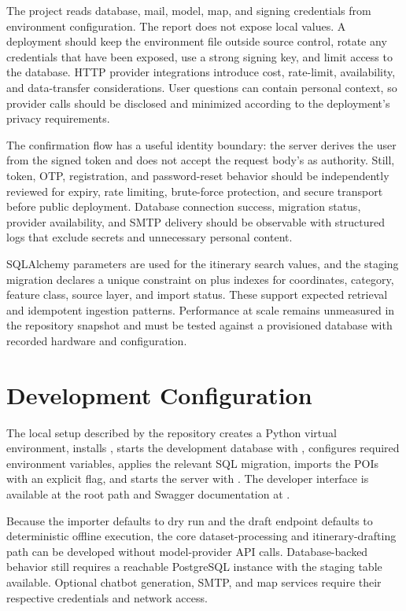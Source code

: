 The project reads database, mail, model, map, and signing credentials from environment configuration. The report does not expose local  values. A deployment should keep the environment file outside source control, rotate any credentials that have been exposed, use a strong signing key, and limit access to the database. HTTP provider integrations introduce cost, rate-limit, availability, and data-transfer considerations. User questions can contain personal context, so provider calls should be disclosed and minimized according to the deployment's privacy requirements.

The confirmation flow has a useful identity boundary: the server derives the user from the signed token and does not accept the request body's  as authority. Still, token, OTP, registration, and password-reset behavior should be independently reviewed for expiry, rate limiting, brute-force protection, and secure transport before public deployment. Database connection success, migration status, provider availability, and SMTP delivery should be observable with structured logs that exclude secrets and unnecessary personal content.

SQLAlchemy parameters are used for the itinerary search values, and the staging migration declares a unique constraint on  plus indexes for coordinates, category, feature class, source layer, and import status. These support expected retrieval and idempotent ingestion patterns. Performance at scale remains unmeasured in the repository snapshot and must be tested against a provisioned database with recorded hardware and configuration.

\section{Development Configuration}

The local setup described by the repository creates a Python virtual environment, installs , starts the development database with , configures required environment variables, applies the relevant SQL migration, imports the POIs with an explicit  flag, and starts the server with . The developer interface is available at the root path and Swagger documentation at .

Because the importer defaults to dry run and the draft endpoint defaults to deterministic offline execution, the core dataset-processing and itinerary-drafting path can be developed without model-provider API calls. Database-backed behavior still requires a reachable PostgreSQL instance with the staging table available. Optional chatbot generation, SMTP, and map services require their respective credentials and network access.
